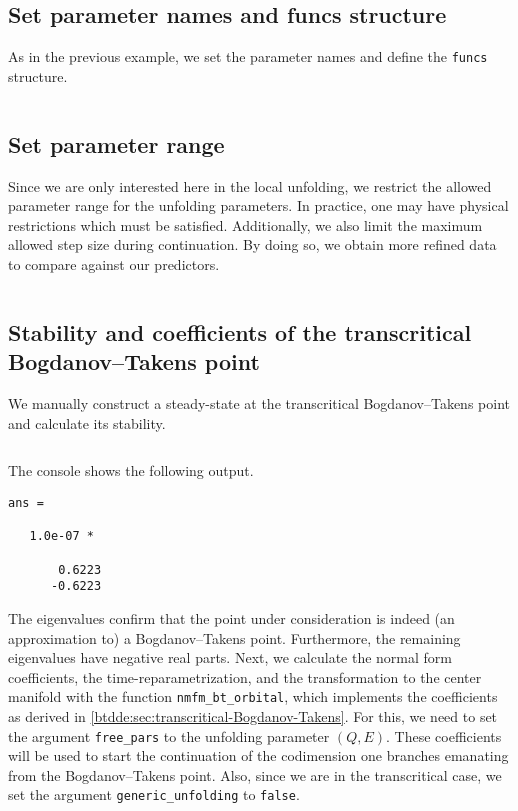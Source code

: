 \subsection{Set parameter names and funcs structure}
\label{sm:sec:vpdo:pars_and_funcs}
As in the previous example, we set the parameter names and define the \texttt{funcs} structure.
\inputminted[firstline=31, lastline=37]{MATLAB}{\pathToDDEBifToolDemos/vdpo_bt_transcritical/vanderPolOscillator.m}

\subsection{Set parameter range}
Since we are only interested here in the local unfolding, we restrict the
allowed parameter range for the unfolding parameters. In practice, one may have
physical restrictions which must be satisfied. Additionally, we also limit the
maximum allowed step size during continuation. By doing so, we obtain more refined
data to compare against our predictors.
\inputminted[firstline=39, lastline=42]{MATLAB}{\pathToDDEBifToolDemos/vdpo_bt_transcritical/vanderPolOscillator.m}

\subsection{Stability and coefficients of the transcritical Bogdanov--Takens point}
We manually construct a steady-state at the transcritical Bogdanov--Takens
point and calculate its stability.
\inputminted[firstline=44, lastline=55]{MATLAB}{\pathToDDEBifToolDemos/vdpo_bt_transcritical/vanderPolOscillator.m}

The \MATLAB console shows the following output.
\begin{verbatim}
ans =

   1.0e-07 *

       0.6223
      -0.6223

\end{verbatim}
The eigenvalues confirm that the point under consideration is indeed (an
approximation to) a Bogdanov--Takens point. Furthermore, the remaining eigenvalues have
negative real parts. Next, we calculate the normal form coefficients, the
time-reparametrization, and the transformation to the center manifold with the
function \texttt{nmfm_bt_orbital}, which implements the coefficients as derived in
\cref{btdde:sec:transcritical-Bogdanov-Takens}. For this, we need to set the argument
\texttt{free_pars} to the unfolding parameter $(Q,E)$. These
coefficients will be used to start the continuation of the codimension one branches
emanating from the Bogdanov--Takens point. Also, since we are in the transcritical case,
we set the argument \texttt{generic_unfolding} to \texttt{false}.
\inputminted[firstline=57, lastline=60]{MATLAB}{\pathToDDEBifToolDemos/vdpo_bt_transcritical/vanderPolOscillator.m}

